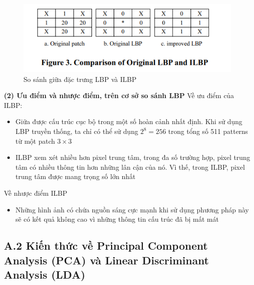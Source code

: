 \documentclass{article}
\begin{document}
	\begin{figure}[H]
		\centering
		\includegraphics[width=0.75\linewidth]{images/cau_d_2.png}
		\caption{So sánh giữa đặc trưng LBP và ILBP}
		\label{fig:writing-thesis}
	\end{figure}

	\textbf{(2) Ưu điểm và nhược điểm, trên cơ sở so sánh LBP}\newline
	Về ưu điểm của ILBP:
	\begin{itemize}
		\item Giữa được cấu trúc cục bộ trong một số hoàn cảnh nhất định. Khi sử dụng LBP truyền thống, ta chỉ có thể sử dụng $2^8 = 256$ trong tổng số 511 patterns từ một patch $3 \times 3$
		\item ILBP xem xét nhiều hơn pixel trung tâm, trong đa số trường hợp, pixel trung tâm có nhiều thông tin hơn những lân cận của nó. Vì thế, trong ILBP, pixel trung tâm được mang trọng số lớn nhất
	\end{itemize}
	Về nhược điểm ILBP
	\begin{itemize}
		\item Những hình ảnh có chứa nguồn sáng cực mạnh khi sử dụng phương pháp này sẽ có kết quả không cao vì những thông tin cấu trúc đã bị mất mát
	\end{itemize}
		
	
	\subsection{A.2 Kiến thức về Principal Component Analysis (PCA) và Linear Discriminant Analysis (LDA)}
	
\end{document}
